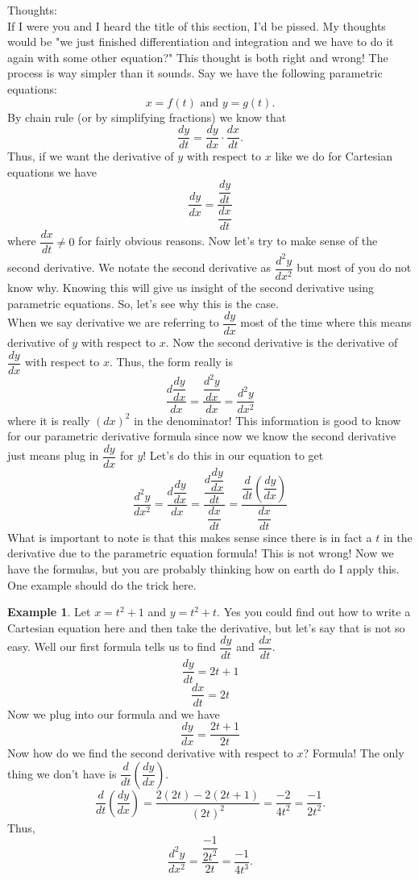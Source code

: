 \documentclass[10pt]{article}
\theoremstyle{Theorem}
\theoremstyle{definition}
\newtheorem{ex}{Example}[section]
\theoremstyle{remark}
\theoremstyle{custom}
\begin{document}
\thispagestyle{firststyle}
\pagestyle{plain}


\noindent Thoughts: \\
If I were you and I heard the title of this section, I'd be pissed. My thoughts would be "we just finished differentiation and integration and we have to do it again with some other equation?" This thought is both right and wrong! The process is way simpler than it sounds. Say we have the following parametric equations:
\[
x=f(t) \text{ and } y=g(t).
\]
By chain rule (or by simplifying fractions) we know that 
\[
\dfrac{dy}{dt}=\dfrac{dy}{dx}\cdot \dfrac{dx}{dt}.
\]
Thus, if we want the derivative of $y$ with respect to $x$ like we do for Cartesian equations we have
\begin{equation}
\dfrac{dy}{dx}=\dfrac{\dfrac{dy}{dt}}{\dfrac{dx}{dt}}
\end{equation}
where $\dfrac{dx}{dt}\neq 0$ for fairly obvious reasons.  Now let's try to make sense of the second derivative. We notate the second derivative as $\dfrac{d^2y}{dx^2}$ but most of you do not know why. Knowing this will give us insight of the second derivative using parametric equations. So, let's see why this is the case.\\
When we say derivative we are referring to $\dfrac{dy}{dx}$ most of the time where this means derivative of $y$ with respect to $x$. Now the second derivative is the derivative of $\dfrac{dy}{dx}$ with respect to $x$. Thus, the form really is 
\[
\dfrac{d\dfrac{dy}{dx}}{dx}=\dfrac{\dfrac{d^2y}{dx}}{dx}=\dfrac{d^2y}{dx^2}
\]
where it is really $(dx)^2$ in the denominator! This information is good to know for our parametric derivative formula since now we know the second derivative just means plug in $\dfrac{dy}{dx}$ for $y$! Let's do this in our equation to get
\begin{equation}
\dfrac{d^2y}{dx^2}=\dfrac{d\dfrac{dy}{dx}}{dx}=\dfrac{\dfrac{d\dfrac{dy}{dx}}{dt}}{\dfrac{dx}{dt}}=\dfrac{\dfrac{d}{dt}\left( \dfrac{dy}{dx}\right)}{\dfrac{dx}{dt}}
\end{equation}
What is important to note is that this makes sense since there is in fact a $t$ in the derivative due to the parametric equation formula! This is not wrong! Now we have the formulas, but you are probably thinking how on earth do I apply this. One example should do the trick here.
\begin{ex}
Let $x=t^2+1$ and $y=t^2+t$. Yes you could find out how to write a Cartesian equation here and then take the derivative, but let's say that is not so easy. Well our first formula tells us to find $\dfrac{dy}{dt}$ and $\dfrac{dx}{dt}$. 
\[
\dfrac{dy}{dt}=2t+1
\]
\[
\dfrac{dx}{dt}=2t
\]
Now we plug into our formula and we have
\[
\dfrac{dy}{dx}=\dfrac{2t+1}{2t}
\]
Now how do we find the second derivative with respect to $x$? Formula! The only thing we don't have is $\dfrac{d}{dt}\left(\dfrac{dy}{dx}\right)$. 
\[
\dfrac{d}{dt}\left(\dfrac{dy}{dx}\right)= \dfrac{2(2t)-2(2t+1)}{(2t)^2}=\dfrac{-2}{4t^2}=\dfrac{-1}{2t^2}.
\]
Thus,
\[
\dfrac{d^2y}{dx^2}=\dfrac{\dfrac{-1}{2t^2}}{2t}=\dfrac{-1}{4t^3}.
\]
\end{ex}
\end{document}
